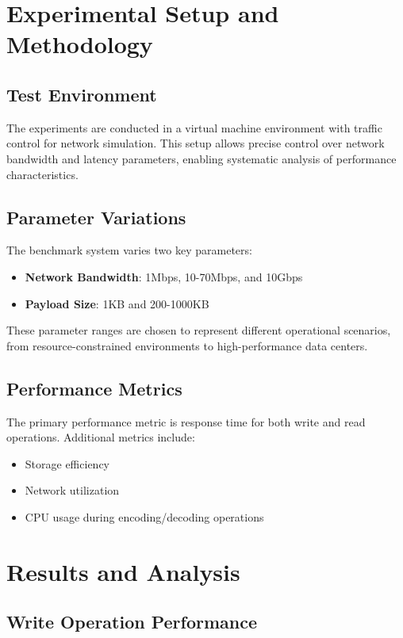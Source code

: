 \section{Experimental Setup and Methodology}

\subsection{Test Environment}

The experiments are conducted in a virtual machine environment with traffic control for network simulation. This setup allows precise control over network bandwidth and latency parameters, enabling systematic analysis of performance characteristics.

\subsection{Parameter Variations}

The benchmark system varies two key parameters:
\begin{itemize}
\item \textbf{Network Bandwidth}: 1Mbps, 10-70Mbps, and 10Gbps
\item \textbf{Payload Size}: 1KB and 200-1000KB
\end{itemize}

These parameter ranges are chosen to represent different operational scenarios, from resource-constrained environments to high-performance data centers.

\subsection{Performance Metrics}

The primary performance metric is response time for both write and read operations. Additional metrics include:
\begin{itemize}
\item Storage efficiency
\item Network utilization
\item CPU usage during encoding/decoding operations
\end{itemize}

\section{Results and Analysis}

\subsection{Write Operation Performance}

